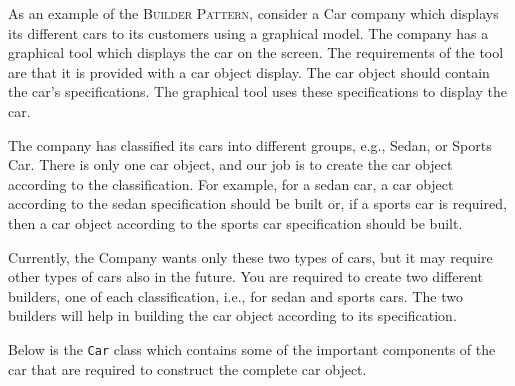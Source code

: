 \documentclass[12pt,a4paper]{exam}
\begin{document}
\begin{questions}
%
%	
%
%
%
%
%
%
%
%
%
%

\question
As an example of the \textsc{Builder Pattern}, consider a Car company which displays its 
different cars to its customers using a graphical model. 
The company has a graphical tool which displays the car on the screen. 
The requirements of the tool are that it is provided with a car object display. 
The car object should contain the car's specifications. 
The graphical tool uses these specifications to display the car. 

The company has classified its cars into different groups, e.g., Sedan, or Sports Car. 
There is only one car object, and our job is to create the car object according 
to the classification. For example, for a sedan car, a car object 
according to the sedan specification should be built or, if a sports car is required, 
then a car object according to the sports car specification should be built. 

Currently, the Company wants only these two types of cars, 
but it may require other types of cars also in the future.
You are required to create two different builders, one of each classification, 
i.e., for sedan and sports cars. 
The two builders will help in building the car object according to its specification. 

Below is the \verb!Car! class which contains some of the important components 
of the car that are required to construct the complete car object.


\end{questions}
\end{document}
